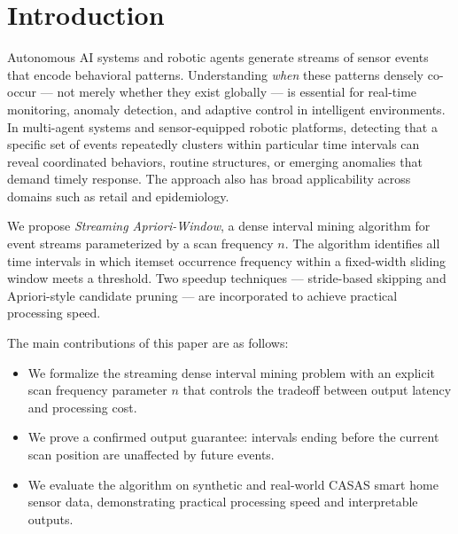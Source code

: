 \section{Introduction}

Autonomous AI systems and robotic agents generate streams of sensor events
that encode behavioral patterns.
Understanding \textit{when} these patterns densely co-occur --- not merely whether
they exist globally --- is essential for real-time monitoring, anomaly detection,
and adaptive control in intelligent environments.
In multi-agent systems and sensor-equipped robotic platforms,
detecting that a specific set of events repeatedly clusters within particular
time intervals can reveal coordinated behaviors, routine structures,
or emerging anomalies that demand timely response.
The approach also has broad applicability across domains such as retail and epidemiology.

We propose \textit{Streaming Apriori-Window}, a dense interval mining
algorithm for event streams parameterized by a scan frequency $n$.
The algorithm identifies all time intervals in which itemset occurrence
frequency within a fixed-width sliding window meets a threshold.
Two speedup techniques --- stride-based skipping and Apriori-style
candidate pruning --- are incorporated to achieve practical processing speed.

The main contributions of this paper are as follows:
\begin{itemize}
  \item We formalize the streaming dense interval mining problem with
        an explicit scan frequency parameter $n$ that controls the tradeoff
        between output latency and processing cost.
  \item We prove a confirmed output guarantee: intervals ending before
        the current scan position are unaffected by future events.
  \item We evaluate the algorithm on synthetic and real-world CASAS
        smart home sensor data, demonstrating practical processing speed
        and interpretable outputs.
\end{itemize}
